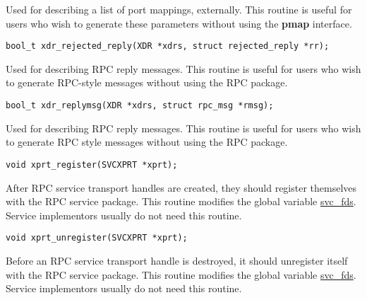\documentclass[]{article}
\let\realtextbf=\textbf
\renewcommand{\textbf}[1]{\textcolor{boldcolor}{\realtextbf{#1}}}
\renewcommand{\emph}[1]{\underline{#1}}
\begin{document}
\begin{description}
\itemsep1pt\parskip0pt
\item[]
Used for describing a list of port mappings, externally. This routine is
useful for users who wish to generate these parameters without using the
\textbf{pmap} interface.
\end{description}

\begin{verbatim}
bool_t xdr_rejected_reply(XDR *xdrs, struct rejected_reply *rr);
\end{verbatim}

\begin{description}
\itemsep1pt\parskip0pt
\item[]
Used for describing RPC reply messages. This routine is useful for users
who wish to generate RPC-style messages without using the RPC package.
\end{description}

\begin{verbatim}
bool_t xdr_replymsg(XDR *xdrs, struct rpc_msg *rmsg);
\end{verbatim}

\begin{description}
\itemsep1pt\parskip0pt
\item[]
Used for describing RPC reply messages. This routine is useful for users
who wish to generate RPC style messages without using the RPC package.
\end{description}

\begin{verbatim}
void xprt_register(SVCXPRT *xprt);
\end{verbatim}

\begin{description}
\itemsep1pt\parskip0pt
\item[]
After RPC service transport handles are created, they should register
themselves with the RPC service package. This routine modifies the
global variable \emph{svc\_fds}. Service implementors usually do not
need this routine.
\end{description}

\begin{verbatim}
void xprt_unregister(SVCXPRT *xprt);
\end{verbatim}

\begin{description}
\itemsep1pt\parskip0pt
\item[]
Before an RPC service transport handle is destroyed, it should
unregister itself with the RPC service package. This routine modifies
the global variable \emph{svc\_fds}. Service implementors usually do not
need this routine.
\end{description}
\end{document}
